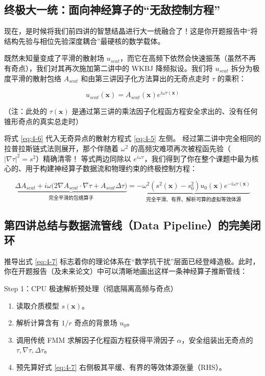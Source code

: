 \documentclass[12pt]{article}
\begin{document}
{\subsection{终极大一统：面向神经算子的“无敌控制方程”}

现在，是时候将我们前四讲的智慧结晶进行大一统融合了！这是你开题报告中“将结构先验与相位先验深度耦合”最硬核的数学载体。

既然未知量变成了平滑的散射场 $u_{scat}$，而它在高频下依然会快速振荡（虽然不再有奇点），我们对其再次施加第二讲中的 WKBJ 降频拟设。我们将 $u_{scat}$ 拆分为极度平滑的散射包络 $A_{scat}$ 和由第三讲因子化方法算出的无奇点走时 $\tau$ 的乘积：

\begin{equation}
u_{scat}(\mathbf{x}) = A_{scat}(\mathbf{x}) e^{i \omega \tau(\mathbf{x})}
\label{eq:4-6}
\end{equation}

（注：此处的 $\tau(\mathbf{x})$ 是通过第三讲的乘法因子化程函方程安全求出的、没有任何锥形奇点的真实总走时）

将式 \eqref{eq:4-6} 代入无奇异点的散射方程式 \eqref{eq:4-5} 左侧。
经过第二讲中完全相同的拉普拉斯链式法则展开，那个伴随着 $\omega^2$ 的高频灾难项再次被程函先验（$|\nabla \tau|^2 = s^2$）精确清零！
等式两边同除以 $e^{i\omega \tau}$，我们得到了你在整个课题中最为核心的、用于构建神经算子数据流和物理约束的终极控制方程：

\begin{equation}
\underbrace{\Delta A_{scat} + i \omega \big(2 \nabla A_{scat} \cdot \nabla \tau + A_{scat} \Delta \tau \big)}_{\text{完全平滑的包络算子}}
=
\underbrace{-\omega^2 \left( s^2(\mathbf{x}) - s_0^2 \right) u_0(\mathbf{x}) e^{-i \omega \tau(\mathbf{x})}}_{\text{完全平滑、有界、解析可算的虚拟等效体源}}
\label{eq:4-7}
\end{equation}

\subsection{第四讲总结与数据流管线（Data Pipeline）的完美闭环}

推导出式 \eqref{eq:4-7} 标志着你的理论体系在“数学抗干扰”层面已经登峰造极。此时，你在开题报告（及未来论文）中可以清晰地画出这样一条神经算子推断管线：

Step 1：CPU 极速解析预处理（彻底隔离高频与奇点）

\begin{enumerate}[leftmargin=2em]
    \item 读取介质模型 $s(\mathbf{x})$。
    \item 解析计算含有 $1/r$ 奇点的背景场 $u_0$。
    \item 调用传统 FMM 求解因子化程函方程获得平滑因子 $\alpha$，安全组装出无奇点的 $\tau, \nabla \tau, \Delta \tau$。
    \item 预先算好式 \eqref{eq:4-7} 右侧极其平缓、有界的等效体源张量（RHS）。
\end{enumerate}

}
\end{document}
